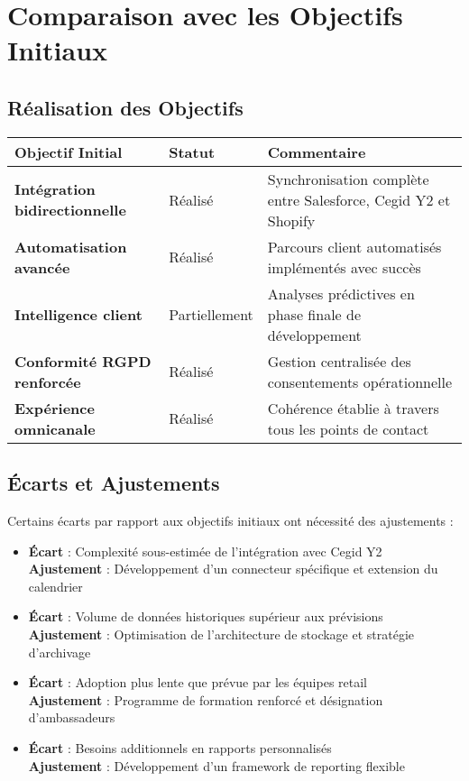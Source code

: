 \section{Comparaison avec les Objectifs Initiaux}

\subsection{Réalisation des Objectifs}

\begin{center}
\begin{tabular}{|>{\bfseries}p{5cm}|p{2.5cm}|p{6cm}|}
\hline
\rowcolor{lightblue} Objectif Initial & Statut & Commentaire \\
\hline
Intégration bidirectionnelle & Réalisé & Synchronisation complète entre Salesforce, Cegid Y2 et Shopify \\
\hline
Automatisation avancée & Réalisé & Parcours client automatisés implémentés avec succès \\
\hline
Intelligence client & Partiellement & Analyses prédictives en phase finale de développement \\
\hline
Conformité RGPD renforcée & Réalisé & Gestion centralisée des consentements opérationnelle \\
\hline
Expérience omnicanale & Réalisé & Cohérence établie à travers tous les points de contact \\
\hline
\end{tabular}
\end{center}

\subsection{Écarts et Ajustements}

\begin{mdframed}[backgroundcolor=lightgreen!20, linewidth=1pt]
Certains écarts par rapport aux objectifs initiaux ont nécessité des ajustements :

\begin{itemize}
    \item \textbf{Écart} : Complexité sous-estimée de l'intégration avec Cegid Y2\\
      \textbf{Ajustement} : Développement d'un connecteur spécifique et extension du calendrier
    \item \textbf{Écart} : Volume de données historiques supérieur aux prévisions\\
      \textbf{Ajustement} : Optimisation de l'architecture de stockage et stratégie d'archivage
    \item \textbf{Écart} : Adoption plus lente que prévue par les équipes retail\\
      \textbf{Ajustement} : Programme de formation renforcé et désignation d'ambassadeurs
    \item \textbf{Écart} : Besoins additionnels en rapports personnalisés\\
      \textbf{Ajustement} : Développement d'un framework de reporting flexible
\end{itemize}
\end{mdframed}

